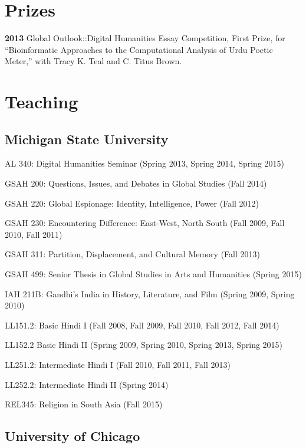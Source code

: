 \documentclass[letterpaper,12pt]{article}
\begin{document}
\section{Prizes%
  \label{prizes}%
}

\textbf{2013}
Global Outlook::Digital Humanities Essay Competition,
First Prize,
for “Bioinformatic Approaches to the Computational Analysis of Urdu Poetic Meter,”
with Tracy K. Teal and C. Titus Brown.


\section{Teaching%
  \label{teaching}%
}


\subsection{Michigan State University%
  \label{michigan-state-university}%
}

AL 340: Digital Humanities Seminar (Spring 2013, Spring 2014, Spring 2015)

GSAH 200: Questions, Issues, and Debates in Global Studies (Fall 2014)

GSAH 220: Global Espionage: Identity, Intelligence, Power (Fall 2012)

GSAH 230: Encountering Difference: East-West, North South (Fall 2009, Fall 2010, Fall 2011)

GSAH 311: Partition, Displacement, and Cultural Memory (Fall 2013)

GSAH 499: Senior Thesis in Global Studies in Arts and Humanities (Spring 2015)

IAH 211B: Gandhi’s India in History, Literature, and Film (Spring 2009, Spring 2010)

LL151.2: Basic Hindi I (Fall 2008, Fall 2009, Fall 2010, Fall 2012, Fall 2014)

LL152.2 Basic Hindi II (Spring 2009, Spring 2010, Spring 2013, Spring 2015)

LL251.2: Intermediate Hindi I (Fall 2010, Fall 2011, Fall 2013)

LL252.2: Intermediate Hindi II (Spring 2014)

REL345: Religion in South Asia (Fall 2015)


\subsection{University of Chicago%
  \label{university-of-chicago}%
}
\end{document}
